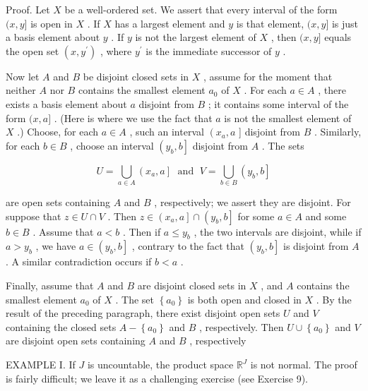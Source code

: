 \documentclass[10pt]{article}
\begin{document}
Proof. Let \(X\) be a well-ordered set. We assert that every interval of the form \((x,y\rbrack\) is open in \(X\) . If \(X\) has a largest element and \(y\) is that element, \((x,y\rbrack\) is just a basis element about \(y\) . If \(y\) is not the largest element of \(X\) , then \((x,y\rbrack\) equals the open set \(\left( {x,{y}^{\prime }}\right)\) , where \({y}^{\prime }\) is the immediate successor of \(y\) .

Now let \(A\) and \(B\) be disjoint closed sets in \(X\) , assume for the moment that neither \(A\) nor \(B\) contains the smallest element \({a}_{0}\) of \(X\) . For each \(a \in  A\) , there exists a basis element about \(a\) disjoint from \(B\) ; it contains some interval of the form \((x,a\rbrack\) . (Here is where we use the fact that \(a\) is not the smallest element of \(X\) .) Choose, for each \(a \in  A\) , such an interval \(\left( {{x}_{a},a}\right.\) ] disjoint from \(B\) . Similarly, for each \(b \in  B\) , choose an interval \(\left( {{y}_{b},b}\right\rbrack\) disjoint from \(A\) . The sets

\[
U = \mathop{\bigcup }\limits_{{a \in  A}}\left( {{x}_{a},a}\right\rbrack  \;\text{ and }\;V = \mathop{\bigcup }\limits_{{b \in  B}}\left( {{y}_{b},b}\right\rbrack
\]

are open sets containing \(A\) and \(B\) , respectively; we assert they are disjoint. For suppose that \(z \in  U \cap  V\) . Then \(z \in  \left( {{x}_{a},a}\right\rbrack   \cap  \left( {{y}_{b},b}\right\rbrack\) for some \(a \in  A\) and some \(b \in  B\) . Assume that \(a < b\) . Then if \(a \leq  {y}_{b}\) , the two intervals are disjoint, while if \(a > {y}_{b}\) , we have \(a \in  \left( {{y}_{b},b}\right\rbrack\) , contrary to the fact that \(\left( {{y}_{b},b}\right\rbrack\) is disjoint from \(A\) . A similar contradiction occurs if \(b < a\) .

Finally, assume that \(A\) and \(B\) are disjoint closed sets in \(X\) , and \(A\) contains the smallest element \({a}_{0}\) of \(X\) . The set \(\left\{  {a}_{0}\right\}\) is both open and closed in \(X\) . By the result of the preceding paragraph, there exist disjoint open sets \(U\) and \(V\) containing the closed sets \(A - \left\{  {a}_{0}\right\}\) and \(B\) , respectively. Then \(U \cup  \left\{  {a}_{0}\right\}\) and \(V\) are disjoint open sets containing \(A\) and \(B\) , respectively

EXAMPLE I. If \(J\) is uncountable, the product space \({\mathbb{R}}^{J}\) is not normal. The proof is fairly difficult; we leave it as a challenging exercise (see Exercise 9).
\end{document}
